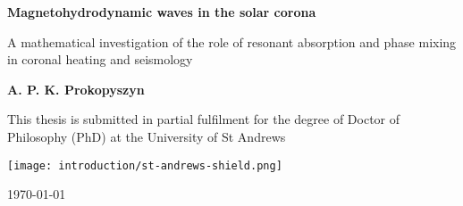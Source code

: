 \begin{titlepage}
    \begin{center}
        
        \Huge
        \textbf{Magnetohydrodynamic waves in the solar corona}
        
        \vspace{0.5cm}
        \LARGE
        A mathematical investigation of the role of resonant absorption and phase mixing in coronal heating and seismology
        
        \vspace{1cm}
        
        \textbf{A. P. K. Prokopyszyn}
        
        \vspace{1cm}
        
        This thesis is submitted in partial fulfilment for the degree of Doctor of Philosophy (PhD) at the University of St Andrews
        
        \vspace{2cm}
        
        \texttt{[image: introduction/st-andrews-shield.png]}
        
        \vspace{0.1cm}
        
        \today
        
    \end{center}
\end{titlepage}



            


            
            
     
            
            
